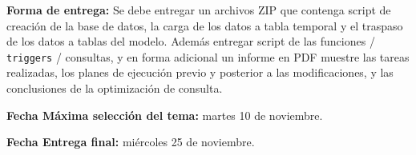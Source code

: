 \documentclass[11pt,a4paper]{article}
\begin{document}
\medskip

\noindent\textbf{Forma de entrega:} Se debe entregar un archivos ZIP que contenga
script de creación de la base de datos, la carga de los datos a tabla temporal y
el traspaso de los datos a tablas del modelo. Además entregar script de las
funciones / \texttt{triggers} / consultas, y en forma adicional un informe en PDF
muestre las tareas realizadas, los planes de ejecución previo y posterior a las
modificaciones, y las conclusiones de la optimización de consulta.

\medskip

\noindent\textbf{Fecha Máxima selección del tema:} martes 10 de noviembre.

\medskip

\noindent\textbf{Fecha Entrega final:} miércoles 25 de noviembre.
\end{document}
